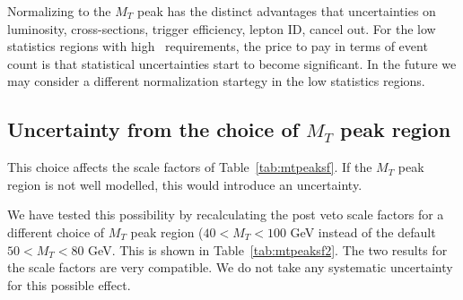 Normalizing to the $M_T$ peak has the distinct advantages that 
uncertainties on luminosity, cross-sections, trigger efficiency,
lepton ID, cancel out.
For the low statistics regions with high \met\ requirements, the
price to pay in terms of event count is that statistical uncertainties start
to become significant.  In the future we may consider a different
normalization startegy in the low statistics regions.

\subsection{Uncertainty from the choice of $M_T$ peak region}

This choice affects the scale factors of Table~\ref{tab:mtpeaksf}.  
If the $M_T$ peak region is not well modelled, this would introduce an
uncertainty.

We have tested this possibility by recalculating the post veto scale factors for a different
choice
of $M_T$ peak region ($40 < M_T < 100$ GeV instead of the default
$50 < M_T < 80$ GeV.  This is shown in Table~\ref{tab:mtpeaksf2}.  
The two results for the scale factors are very compatible. 
We do not take any systematic uncertainty for this possible effect.

